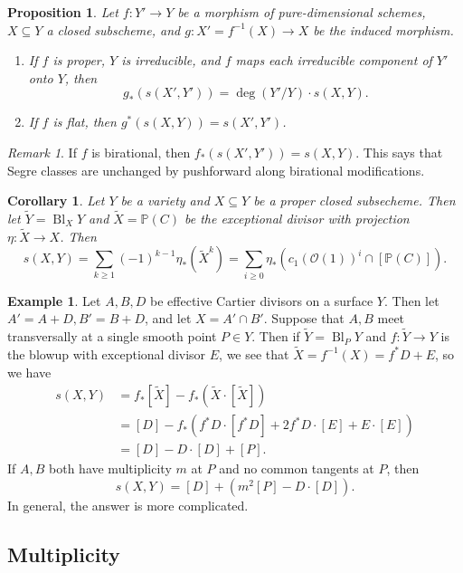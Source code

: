 \documentclass[leqno, openany]{memoir}
\newtheorem{cor}[thm]{Corollary}
\newtheorem{prop}[thm]{Proposition}
\theoremstyle{definition}
\newtheorem{exm}[thm]{Example}
\theoremstyle{remark}
\newtheorem{rmk}[thm]{Remark}
\theoremstyle{plain}
\theoremstyle{definition}
\theoremstyle{remark}
\renewcommand{\P}{\mathbb{P}}
\newcommand{\mc}[1]{\mathcal{#1}}
\newcommand{\wt}[1]{\widetilde{#1}}
\DeclareMathOperator{\Bl}{Bl}
\begin{document}
\begin{prop} Let $f \colon Y' \to Y$ be a morphism of pure-dimensional schemes,
    $X \subseteq Y$ a closed subscheme, and $g \colon X' = f^{-1}(X) \to X$ be
    the induced morphism.  \begin{enumerate} \item If $f$ is proper, $Y$ is
        irreducible, and $f$ maps each irreducible component of $Y'$ onto $Y$,
        then \[ g_* (s(X', Y')) = \deg (Y'/Y) \cdot s(X,Y). \] \item If $f$ is
flat, then $g^*(s(X,Y)) = s(X',Y')$.  \end{enumerate} \end{prop}

\begin{rmk} If $f$ is birational, then $f_* (s(X', Y')) = s(X,Y)$. This says
that Segre classes are unchanged by pushforward along birational modifications.
\end{rmk}

\begin{cor} Let $Y$ be a variety and $X \subseteq Y$ be a proper closed
    subsecheme. Then let $\wt{Y} = \operatorname{Bl}_X Y$ and $\wt{X} = \P(C)$
    be the exceptional divisor with projection $\eta \colon \wt{X} \to X$. Then
    \[ s(X,Y) = \sum_{k \geq 1} {(-1)}^{k-1} \eta_* (\wt{X}^k) = \sum_{i \geq
    0} \eta_* ({c_1(\mc{O}(1))}^i \cap [\P(C)]). \] \end{cor}

\begin{exm} Let $A, B, D$ be effective Cartier divisors on a surface $Y$. Then
    let $A' = A + D, B' = B + D$, and let $X = A' \cap B'$. Suppose that $A, B$
    meet transversally at a single smooth point $P \in Y$. Then if $\wt{Y} =
    \Bl_P Y$ and $f \colon \wt{Y} \to Y$ is the blowup with exceptional divisor
    $E$, we see that $\wt{X} = f^{-1}(X) = f^* D + E$, so we have
    \begin{align*} s(X,Y) &= f_* [\wt{X}] - f_* (\wt{X} \cdot [\wt{X}]) \\ &=
    [D] - f_* (f^* D \cdot [f^* D] + 2 f^* D \cdot [E] + E \cdot [E]) \\ &= [D]
- D \cdot [D] + [P].  \end{align*} If $A,B$ both have multiplicity $m$ at $P$
and no common tangents at $P$, then \[ s(X,Y) = [D] + (m^2[P] - D \cdot [D]).
\] In general, the answer is more complicated.  \end{exm}

\subsection{Multiplicity}%
\end{document}
